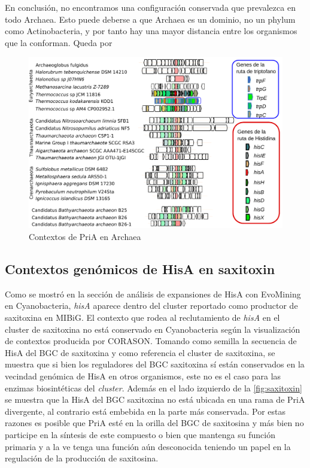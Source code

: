 \documentclass[12pt,twoside]{reedthesis}
\begin{document}
  En conclusión, no encontramos una configuración conservada que
  prevalezca en todo Archaea. Esto puede deberse a que Archaea es un
  dominio, no un phylum como Actinobacteria, y por tanto hay una mayor
  distancia entre los organismos que la conforman. Queda por
  
  \begin{figure}[h!tbp]
  \centering
  \includegraphics[angle = 0,scale = 0.8]{chapter4/CORASON/ArchaeaCORASON.pdf}
  \caption[Contextos de PriA en Archaea]{\footnotesize{Contextos de PriA en Archaea}}
  \label{fig:ArchaeaCORASON}
  \end{figure}
  
  \subsection{Contextos genómicos de HisA en
  saxitoxin}\label{contextos-genomicos-de-hisa-en-saxitoxin}
  
  Como se mostró en la sección de análisis de expansiones de HisA con
  EvoMining en Cyanobacteria, \emph{hisA} aparece dentro del cluster
  reportado como productor de saxitoxina en MIBiG. El contexto que rodea
  al reclutamiento de \emph{hisA} en el cluster de saxitoxina no está
  conservado en Cyanobacteria según la visualización de contextos
  producida por CORASON. Tomando como semilla la secuencia de HisA del BGC
  de saxitoxina y como referencia el cluster de saxitoxina, se muestra que
  si bien los reguladores del BGC saxitoxina sí están conservados en la
  vecindad genómica de HisA en otros organismos, este no es el caso para
  las enzimas biosintéticas del \emph{cluster}. Además en el lado
  izquierdo de la \autoref{fig:saxitoxin} se muestra que la HisA del BGC
  saxitoxina no está ubicada en una rama de PriA divergente, al contrario
  está embebida en la parte más conservada. Por estas razones es posible
  que PriA esté en la orilla del BGC de saxitosina y más bien no participe
  en la síntesis de este compuesto o bien que mantenga su función primaria
  y a la ve tenga una función aún desconocida teniendo un papel en la
  regulación de la producción de saxitosina.
  
\end{document}
